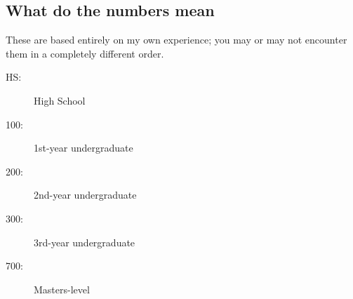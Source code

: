 \subsection{What do the numbers mean}

These are based entirely on my own experience; you may or may not encounter them in a completely different order.

\begin{description}
\item[HS:] High School
\item[100:] 1st-year undergraduate
\item[200:] 2nd-year undergraduate
\item[300:] 3rd-year undergraduate
\item[700:] Masters-level
\end{description}
	